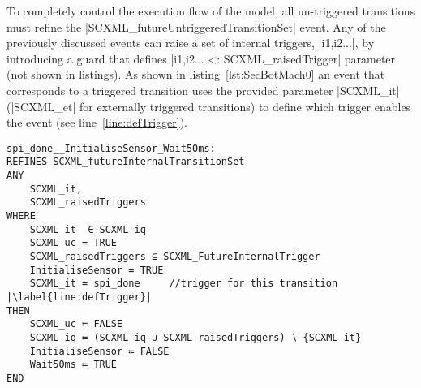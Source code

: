 To completely control the execution flow of the model, all un-triggered transitions must refine the |SCXML_futureUntriggeredTransitionSet| event. 
Any of the previously discussed events can raise a set of internal triggers, |{i1,i2...}|, by introducing a guard that defines |{i1,i2...} <: SCXML_raisedTrigger| parameter (not shown in listings). 
As shown in listing~\ref{lst:SecBotMach0} an event that corresponds to a triggered transition uses the provided parameter |SCXML_it| (|SCXML_et| for externally triggered transitions) to define which trigger enables the event (see line~\ref{line:defTrigger}).

\begin{lstlisting}[caption={Event-B event corresponding to internal triggered transition to \textbf{Wait50ms} state in refinement level 1 shown in~\ref{fig:ASIC}}, label={lst:SecBotMach0},language=Event-B, escapechar=|, frame=single]
spi_done__InitialiseSensor_Wait50ms:	
REFINES SCXML_futureInternalTransitionSet 
ANY	
	SCXML_it,
	SCXML_raisedTriggers
WHERE
	SCXML_it  ∈ SCXML_iq 
	SCXML_uc = TRUE
	SCXML_raisedTriggers ⊆ SCXML_FutureInternalTrigger
	InitialiseSensor = TRUE
	SCXML_it = spi_done  	//trigger for this transition |\label{line:defTrigger}|
THEN
	SCXML_uc ≔ FALSE
	SCXML_iq ≔ (SCXML_iq ∪ SCXML_raisedTriggers) ∖ {SCXML_it}
	InitialiseSensor ≔ FALSE
	Wait50ms ≔ TRUE
END
\end{lstlisting}
